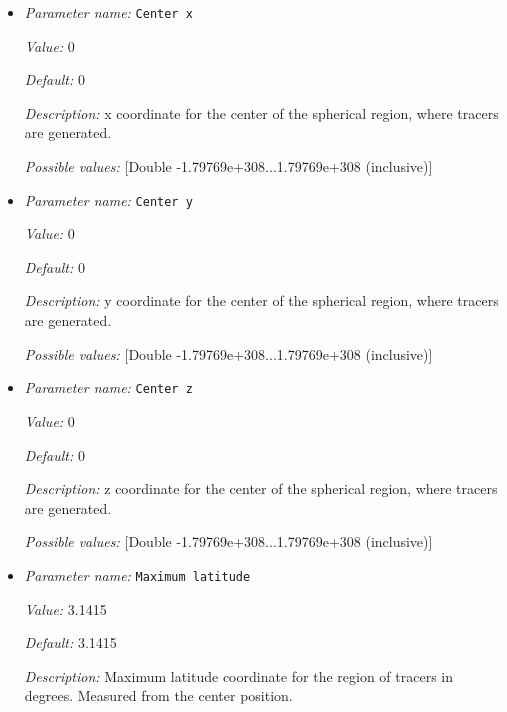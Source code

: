 \begin{itemize}
\item {\it Parameter name:} {\tt Center x}
\label{parameters:Postprocess/Tracers/Generator/Uniform radial/Center x}


{\it Value:} 0


{\it Default:} 0


{\it Description:} x coordinate for the center of the spherical region, where tracers are generated.


{\it Possible values:} [Double -1.79769e+308...1.79769e+308 (inclusive)]
\item {\it Parameter name:} {\tt Center y}
\label{parameters:Postprocess/Tracers/Generator/Uniform radial/Center y}


{\it Value:} 0


{\it Default:} 0


{\it Description:} y coordinate for the center of the spherical region, where tracers are generated.


{\it Possible values:} [Double -1.79769e+308...1.79769e+308 (inclusive)]
\item {\it Parameter name:} {\tt Center z}
\label{parameters:Postprocess/Tracers/Generator/Uniform radial/Center z}


{\it Value:} 0


{\it Default:} 0


{\it Description:} z coordinate for the center of the spherical region, where tracers are generated.


{\it Possible values:} [Double -1.79769e+308...1.79769e+308 (inclusive)]
\item {\it Parameter name:} {\tt Maximum latitude}
\label{parameters:Postprocess/Tracers/Generator/Uniform radial/Maximum latitude}


{\it Value:} 3.1415


{\it Default:} 3.1415


{\it Description:} Maximum latitude coordinate for the region of tracers in degrees. Measured from the center position.



\end{itemize}
